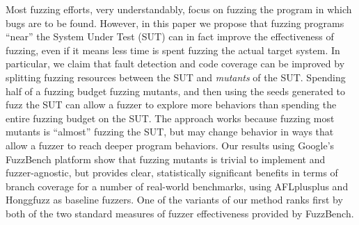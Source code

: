 Most fuzzing efforts, very understandably, focus on fuzzing the program
in which bugs are to be found.  However, in this paper we propose that
fuzzing programs ``near'' the System Under Test (SUT) can in fact
improve the effectiveness of fuzzing, even if it means less time is
spent fuzzing the actual target system.  In particular, we claim that
fault detection and code coverage can be improved by splitting fuzzing
resources between the SUT and \emph{mutants} of the SUT.  Spending
half of a fuzzing budget fuzzing mutants, and then using the seeds
generated to fuzz the SUT can allow a fuzzer to explore more behaviors
than spending the entire fuzzing budget on the SUT.  The approach
works because fuzzing most mutants is ``almost'' fuzzing the SUT, but
may change behavior in ways that allow a fuzzer to reach deeper
program behaviors.  Our results using Google's FuzzBench platform show that fuzzing mutants
is trivial to implement and fuzzer-agnostic, but provides clear, statistically significant
benefits in terms of branch coverage for a number of
real-world benchmarks, using AFLplusplus and Honggfuzz as baseline
fuzzers.  One of the variants of our method ranks first by both of the two standard measures of fuzzer effectiveness
provided by FuzzBench.  